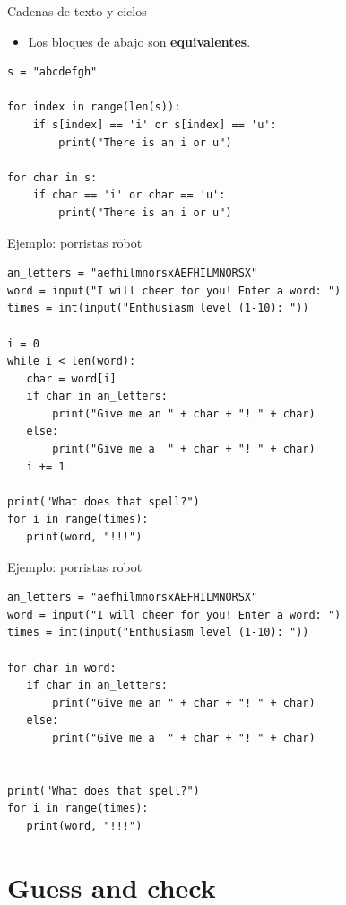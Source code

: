 \documentclass[mathserif]{beamer}
\begin{document}
\begin{frame}[fragile]{Cadenas de texto y ciclos}
    \begin{itemize}
        \item Los bloques de abajo son {\blue\bfseries equivalentes}.
        
    \end{itemize}
\begin{lstlisting}
s = "abcdefgh"

for index in range(len(s)):
    if s[index] == 'i' or s[index] == 'u':
        print("There is an i or u")

for char in s:
    if char == 'i' or char == 'u':
        print("There is an i or u")
\end{lstlisting}

\end{frame}

\begin{frame}[fragile]{Ejemplo: porristas robot}
\begin{lstlisting}
an_letters = "aefhilmnorsxAEFHILMNORSX"
word = input("I will cheer for you! Enter a word: ")
times = int(input("Enthusiasm level (1-10): "))

i = 0
while i < len(word):
   char = word[i]
   if char in an_letters:
       print("Give me an " + char + "! " + char)
   else:
       print("Give me a  " + char + "! " + char)
   i += 1
   
print("What does that spell?")
for i in range(times):
   print(word, "!!!")
\end{lstlisting}
\end{frame}

\begin{frame}[fragile]{Ejemplo: porristas robot}
\begin{lstlisting}
an_letters = "aefhilmnorsxAEFHILMNORSX"
word = input("I will cheer for you! Enter a word: ")
times = int(input("Enthusiasm level (1-10): "))

for char in word:
   if char in an_letters:
       print("Give me an " + char + "! " + char)
   else:
       print("Give me a  " + char + "! " + char)
       
   
print("What does that spell?")
for i in range(times):
   print(word, "!!!")
\end{lstlisting}
\end{frame}



\section{Guess and check}
\end{document}
